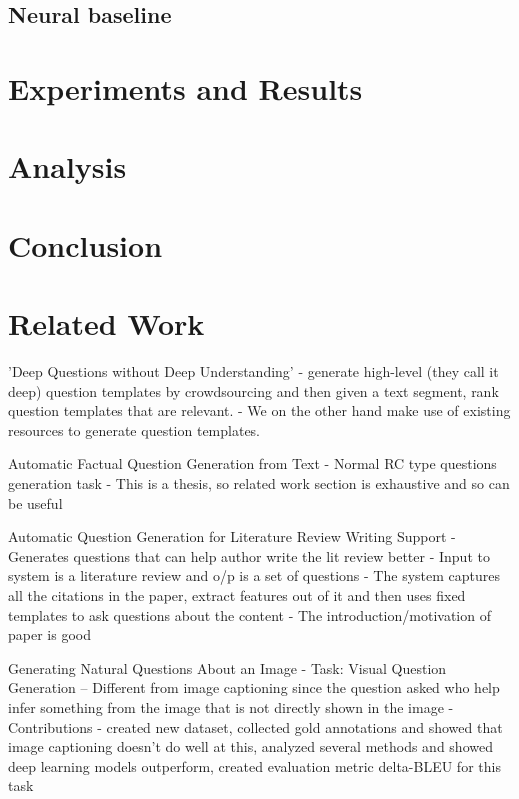 \documentclass[11pt]{article}
\begin{document}
\subsection{Neural baseline}

\section{Experiments and Results}\label{experiments_results}

\section{Analysis}

\section{Conclusion}


\iffalse

\section{Related Work} \label{related_work}

'Deep Questions without Deep Understanding' 
- generate high-level (they call it deep) question templates by crowdsourcing and then given a text segment, rank question templates that are relevant. 
- We on the other hand make use of existing resources to generate question templates. 

Automatic Factual Question Generation from Text 
- Normal RC type questions generation task
- This is a thesis, so related work section is exhaustive and so can be useful

Automatic Question Generation for Literature Review Writing Support
- Generates questions that can help author write the lit review better
- Input to system is a literature review and o/p is a set of questions
- The system captures all the citations in the paper, extract features out of it and then uses fixed templates to ask questions about the content
- The introduction/motivation of paper is good
						
Generating Natural Questions About an Image 
- Task: Visual Question Generation -- Different from image captioning since the question asked who help infer something from the image that is not directly shown in the image
- Contributions - created new dataset, collected gold annotations and showed that image captioning doesn't do well at this, analyzed several methods and showed deep learning models outperform, created evaluation metric delta-BLEU for this task
			
\end{document}
